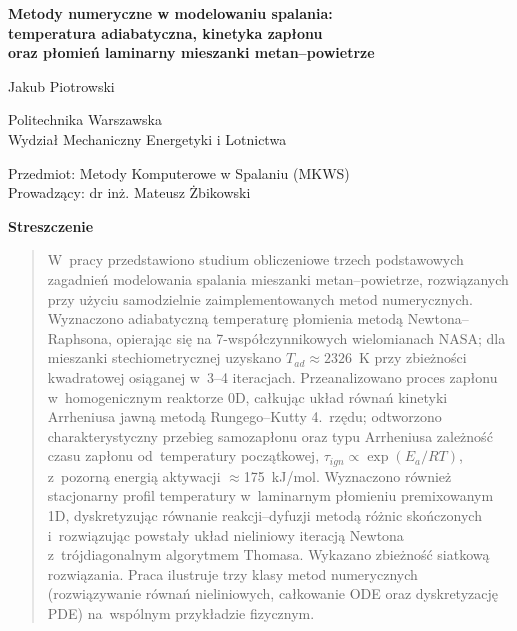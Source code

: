 \documentclass[11pt,a4paper]{article}
\begin{document}
\begin{center}
  {\LARGE\bfseries Metody numeryczne w modelowaniu spalania:\\[4pt]
  temperatura adiabatyczna, kinetyka zapłonu\\ oraz płomień laminarny
  mieszanki metan--powietrze\par}
  \vspace{1.4cm}
  {\large Jakub Piotrowski\par}
  \vspace{0.6cm}
  {\normalsize Politechnika Warszawska\\
  Wydział Mechaniczny Energetyki i Lotnictwa\par}
  \vspace{0.4cm}
  {\normalsize Przedmiot: Metody Komputerowe w Spalaniu (MKWS)\\
  Prowadzący: dr inż. Mateusz Żbikowski\par}
  \vspace{0.4cm}
  {\normalsize \the\year\par}
\end{center}
\vspace{0.8cm}

\begin{center}\textbf{Streszczenie}\end{center}
\begin{quotation}
\noindent
W~pracy przedstawiono studium obliczeniowe trzech podstawowych zagadnień
modelowania spalania mieszanki metan--powietrze, rozwiązanych przy użyciu
samodzielnie zaimplementowanych metod numerycznych. Wyznaczono adiabatyczną
temperaturę płomienia metodą Newtona--Raphsona, opierając się na
7-współczynnikowych wielomianach NASA; dla mieszanki stechiometrycznej uzyskano
$T_{ad}\approx 2326$~K przy zbieżności kwadratowej osiąganej w~3--4 iteracjach.
Przeanalizowano proces zapłonu w~homogenicznym reaktorze 0D, całkując układ
równań kinetyki Arrheniusa jawną metodą Rungego--Kutty 4.~rzędu; odtworzono
charakterystyczny przebieg samozapłonu oraz typu Arrheniusa zależność czasu
zapłonu od~temperatury początkowej, $\tau_{ign}\propto\exp(E_a/RT)$, z~pozorną
energią aktywacji $\approx$175~kJ/mol. Wyznaczono również stacjonarny profil
temperatury w~laminarnym płomieniu premixowanym 1D, dyskretyzując równanie
reakcji--dyfuzji metodą różnic skończonych i~rozwiązując powstały układ
nieliniowy iteracją Newtona z~trójdiagonalnym algorytmem Thomasa. Wykazano
zbieżność siatkową rozwiązania. Praca ilustruje trzy klasy metod numerycznych
(rozwiązywanie równań nieliniowych, całkowanie ODE oraz dyskretyzację PDE)
na~wspólnym przykładzie fizycznym.
\end{quotation}
\end{document}
